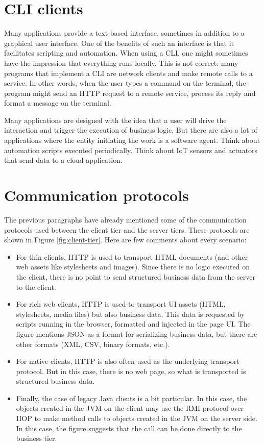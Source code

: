 \section{CLI clients}


Many applications provide a text-based interface, sometimes in addition to a graphical user interface. One of the benefits of such an interface is that it facilitates scripting and automation. When using a \ac{CLI}, one might sometimes have the impression that everything runs locally. This is not correct: many programs that implement a \ac{CLI} are network clients and make remote calls to a service. In other words, when the user types a command on the terminal, the program might send an HTTP request to a remote service, process its reply and format a message on the terminal.

Many applications are designed with the idea that a user will drive the interaction and trigger the execution of business logic. But there are also a lot of applications where the entity initiating the work is a software agent. Think about automation scripts executed periodically. Think about IoT sensors and actuators that send data to a cloud application.

\section{Communication protocols}

The previous paragraphs have already mentioned some of the communication protocols used between the client tier and the server tiers. These protocols are shown in Figure \ref{fig:client-tier}. Here are few comments about every scenario:

\begin{itemize}
\item For thin clients, HTTP is used to transport HTML documents (and other web assets like stylesheets and images). Since there is no logic executed on the client, there is no point to send structured business data from the server to the client.
\item For rich web clients, HTTP is used to transport UI assets (HTML, stylesheets, media files) but also business data. This data is requested by scripts running in the browser, formatted and injected in the page UI. The figure mentions JSON as a format for serializing business data, but there are other formats (XML, CSV, binary formats, etc.).
\item For native clients, HTTP is also often used as the underlying transport protocol. But in this case, there is no web page, so what is transported is structured business data.
\item Finally, the case of legacy Java clients is a bit particular. In this case, the objects created in the \ac{JVM} on the client may use the \ac{RMI} protocol over \ac{IIOP} to make method calls to objects created in the \ac{JVM} on the server side. In this case, the figure suggests that the call can be done directly to the business tier.
\end{itemize}

